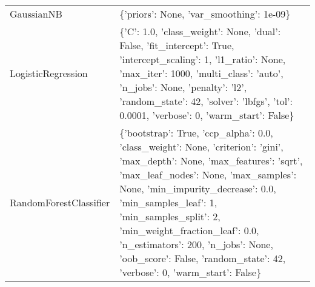 \begin{tabular}{p{4.3cm}|p{9cm}}
            GaussianNB &                                                                                                                                                                                                                                                                                                                                                                                                                                                       \{'priors': None, 'var\_smoothing': 1e-09\} \\
    LogisticRegression &                                                                                                                                                                                                            \{'C': 1.0, 'class\_weight': None, 'dual': False, 'fit\_intercept': True, 'intercept\_scaling': 1, 'l1\_ratio': None, 'max\_iter': 1000, 'multi\_class': 'auto', 'n\_jobs': None, 'penalty': 'l2', 'random\_state': 42, 'solver': 'lbfgs', 'tol': 0.0001, 'verbose': 0, 'warm\_start': False\} \\
RandomForestClassifier &                                                                                         \{'bootstrap': True, 'ccp\_alpha': 0.0, 'class\_weight': None, 'criterion': 'gini', 'max\_depth': None, 'max\_features': 'sqrt', 'max\_leaf\_nodes': None, 'max\_samples': None, 'min\_impurity\_decrease': 0.0, 'min\_samples\_leaf': 1, 'min\_samples\_split': 2, 'min\_weight\_fraction\_leaf': 0.0, 'n\_estimators': 200, 'n\_jobs': None, 'oob\_score': False, 'random\_state': 42, 'verbose': 0, 'warm\_start': False\} \\
\bottomrule
\end{tabular}
